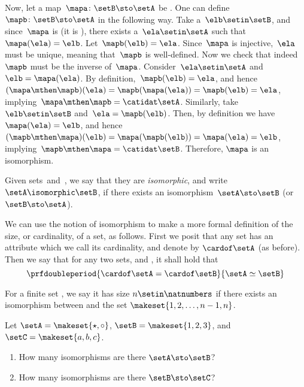 \begin{solution}
    Now, let a map~$\mapa\colon \setB \sto \setA$ be .
    One can define~$\mapb\colon \setB \sto \setA$ in the following way.
    Take a~$\elb\setin\setB$, and since~$\mapa$ is  (it is ), there exists a~$\ela\setin\setA$ such that~$\mapa(\ela)=\elb$.
    Let~$\mapb(\elb)=\ela$.
    Since~$\mapa$ is injective,~$\ela$ must be unique, meaning that~$\mapb$ is well-defined.
    Now we check that indeed~$\mapb$ must be the inverse of~$\mapa$.
    Consider~$\ela \setin\setA$ and~$\elb=\mapa(\ela)$.
    By definition,~$\mapb(\elb)=\ela$, and hence~$(\mapa\mthen \mapb)(\ela)=\mapb(\mapa(\ela))=\mapb(\elb)=\ela$, implying~$\mapa\mthen \mapb=\catidat\setA$.
    Similarly, take~$\elb\setin\setB$ and~$\ela=\mapb(\elb)$.
    Then, by definition we have~$\mapa(\ela)=\elb$, and hence~$(\mapb\mthen \mapa)(\elb)=\mapa(\mapb(\elb))=\mapa(\ela)=\elb$, implying~$\mapb\mthen \mapa=\catidat\setB$.
    Therefore, $\mapa$ is an isomorphism.
\end{solution}

\begin{ctdefinition}\label{def:set-isomorphic}
    Given sets~\setA and~\setB, we say that they are \emph{isomorphic}, and write~$\setA \isomorphic \setB$,
    if there exists an isomorphism~$\setA \sto \setB$ (or~$\setB \sto \setA$).
\end{ctdefinition}

We can use the notion of isomorphism to make a more formal definition of the size, or cardinality, of a set, as follows.
First we posit that any set \setA has an attribute which we call its cardinality, and denote by $\cardof \setA$ (as before).
Then we say that for any two sets, \setA and \setB, it shall hold that
\begin{equation}
    \prfdoubleperiod{
        \cardof \setA  = \cardof \setB
    }{
        \setA \simeq \setB
    }
\end{equation}

For a finite set \setA, we say it has size $n \setin \natnumbers$ if there exists an isomorphism between \setA and the set $\makeset{1,2, \dots, n-1, n}$.

\begin{gradedexercise}
    \label{ex:CountingIsos}

    Let $\setA = \makeset{\star, \circ }$, $\setB = \makeset{1, 2, 3}$, and $\setC = \makeset{a, b, c}$.
    \begin{enumerate}
        \item How many isomorphisms are there $\setA \sto \setB$?
        \item How many isomorphisms are there $\setB \sto \setC$?
    \end{enumerate}
\end{gradedexercise}

